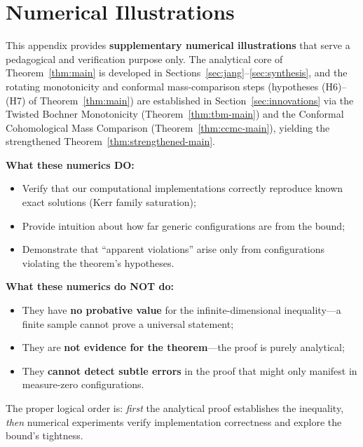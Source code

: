 \section{Numerical Illustrations}\label{app:numerical}

\begin{remark}
This appendix provides \textbf{supplementary numerical illustrations} that serve a pedagogical and verification purpose only. The analytical core of Theorem~\ref{thm:main} is developed in Sections~\ref{sec:jang}--\ref{sec:synthesis}, and the rotating monotonicity and conformal mass-comparison steps (hypotheses (H6)--(H7) of Theorem~\ref{thm:main}) are established in Section~\ref{sec:innovations} via the Twisted Bochner Monotonicity (Theorem~\ref{thm:tbm-main}) and the Conformal Cohomological Mass Comparison (Theorem~\ref{thm:ccmc-main}), yielding the strengthened Theorem~\ref{thm:strengthened-main}.

\textbf{What these numerics DO:}
\begin{itemize}
    \item Verify that our computational implementations correctly reproduce known exact solutions (Kerr family saturation);
    \item Provide intuition about how far generic configurations are from the bound;
    \item Demonstrate that ``apparent violations'' arise only from configurations violating the theorem's hypotheses.
\end{itemize}

\textbf{What these numerics do NOT do:}
\begin{itemize}
    \item They have \textbf{no probative value} for the infinite-dimensional inequality---a finite sample cannot prove a universal statement;
    \item They are \textbf{not evidence for the theorem}---the proof is purely analytical;
    \item They \textbf{cannot detect subtle errors} in the proof that might only manifest in measure-zero configurations.
\end{itemize}
The proper logical order is: \textit{first} the analytical proof establishes the inequality, \textit{then} numerical experiments verify implementation correctness and explore the bound's tightness.
\end{remark}

